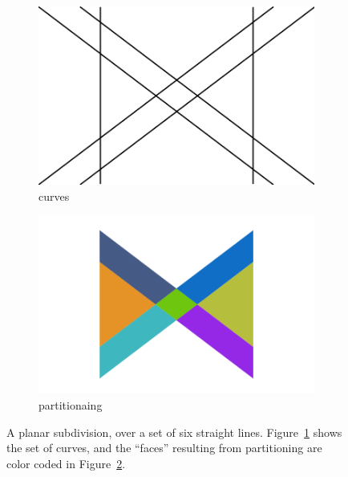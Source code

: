 \begin{figure}%
  \centering
  \begin{subfigure}{.4\textwidth}
    \includegraphics[width=\textwidth]{figures/intro_curves1.png}
    \caption{curves} \label{subfig:intro_curves1}
  \end{subfigure}%
  \quad \quad \quad%
  \begin{subfigure}{.4\textwidth}
    \includegraphics[width=\textwidth]{figures/intro_partitioning1.png}
    \caption{partitionaing} \label{subfig:intro_partitioning1}
  \end{subfigure}%
  \caption[xxx]
          {A planar subdivision, over a set of six straight lines.
          Figure~\ref{subfig:intro_curves1} shows the set of curves, and the ``faces'' resulting from partitioning are color coded in Figure~\ref{subfig:intro_partitioning1}.}
  \label{fig:intro_curvesPartitioning1}
\end{figure}

